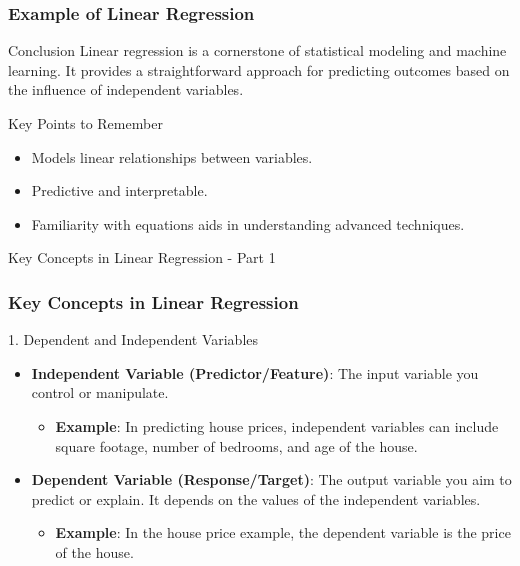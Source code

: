 \documentclass[aspectratio=169]{beamer}
\begin{document}
\begin{frame}[fragile]
    \frametitle{Example of Linear Regression}
    
    \begin{block}{Conclusion}
        Linear regression is a cornerstone of statistical modeling and machine learning. It provides a straightforward approach for predicting outcomes based on the influence of independent variables.
    \end{block}
    
    \begin{block}{Key Points to Remember}
        \begin{itemize}
            \item Models linear relationships between variables.
            \item Predictive and interpretable.
            \item Familiarity with equations aids in understanding advanced techniques.
        \end{itemize}
    \end{block}
\end{frame}

\begin{frame}[fragile]{Key Concepts in Linear Regression - Part 1}
    \frametitle{Key Concepts in Linear Regression}
    
    \begin{block}{1. Dependent and Independent Variables}
        \begin{itemize}
            \item \textbf{Independent Variable (Predictor/Feature)}: The input variable you control or manipulate.
                \begin{itemize}
                    \item \textbf{Example}: In predicting house prices, independent variables can include square footage, number of bedrooms, and age of the house.
                \end{itemize}
            
            \item \textbf{Dependent Variable (Response/Target)}: The output variable you aim to predict or explain. It depends on the values of the independent variables.
                \begin{itemize}
                    \item \textbf{Example}: In the house price example, the dependent variable is the price of the house.
                \end{itemize}
        \end{itemize}
    \end{block}
\end{frame}
\end{document}

